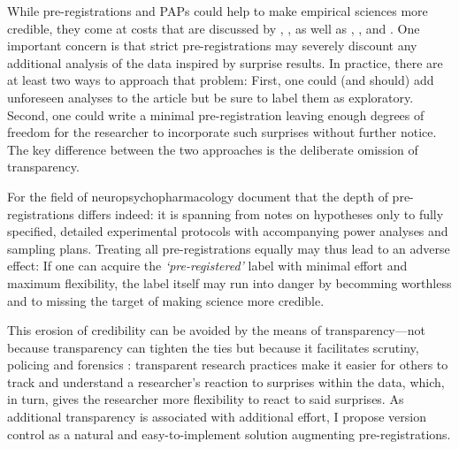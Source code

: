 \documentclass[
  authoryear,
  review,
  3p,
  onecolumn]{elsarticle}
\begin{document}
While pre-registrations and PAPs could help to make empirical sciences
more credible, they come at costs that are discussed by
\citet{Olken2015}, \citet{PageEtAl2021}, as well as \citet{Krishna2021},
\citet{SimmonsEtAl2021}, and \citet{PhamEtAl2021}. One important concern
is that strict pre-registrations may severely discount any additional
analysis of the data inspired by surprise results. In practice, there
are at least two ways to approach that problem: First, one could (and
should) add unforeseen analyses to the article but be sure to label them
as exploratory. Second, one could write a minimal pre-registration
leaving enough degrees of freedom for the researcher to incorporate such
surprises without further notice. The key difference between the two
approaches is the deliberate omission of transparency.

For the field of neuropsychopharmacology \citet{WaldronAllen2022}
document that the depth of pre-registrations differs indeed: it is
spanning from notes on hypotheses only to fully specified, detailed
experimental protocols with accompanying power analyses and sampling
plans. Treating all pre-registrations equally may thus lead to an
adverse effect: If one can acquire the \emph{`pre-registered'} label
with minimal effort and maximum flexibility, the label itself may run
into danger by becomming worthless and to missing the target of making
science more credible.

This erosion of credibility can be avoided by the means of
transparency---not because transparency can tighten the ties but because
it facilitates scrutiny, policing
\citep[see][]{AnkelPetersFialaNeubauer2023} and forensics \citep[see,
e.g.,][]{SimonsohnEtAl2023}: transparent research practices make it
easier for others to track and understand a researcher's reaction to
surprises within the data, which, in turn, gives the researcher more
flexibility to react to said surprises. As additional transparency is
associated with additional effort, I propose version control as a
natural and easy-to-implement solution augmenting pre-registrations.
\end{document}
